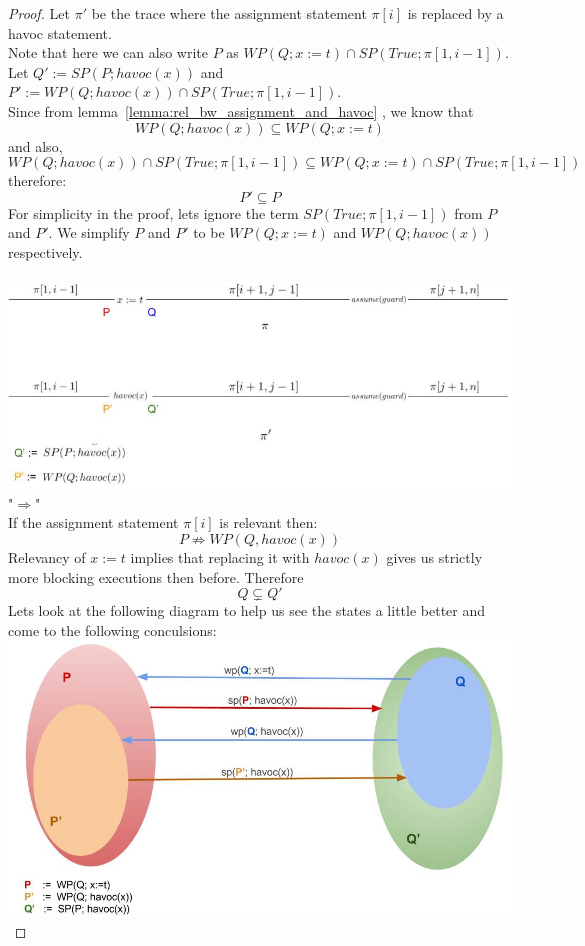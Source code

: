 \documentclass{article}
\newcommand{\limp}{\Rightarrow}
\begin{document}
\begin{proof}
Let $\pi'$ be the trace where the assignment statement $\pi[i]$ is replaced by a havoc statement. \\
Note that here we can also write $P$ as $WP(Q; x:=t) \cap SP(True; \pi[1, i-1])$.\\
Let $Q' := SP(P; havoc(x))$ and $P' := WP(Q;havoc(x)) \cap SP(True; \pi[1, i-1])$. \\
Since from lemma~\ref{lemma:rel_bw_assignment_and_havoc} , we know that 
$$WP(Q; havoc(x)) \subseteq WP(Q; x:=t)$$
and also,
$$WP(Q; havoc(x)) \cap SP(True; \pi[1, i-1])  \subseteq WP(Q; x:=t) \cap SP(True; \pi[1, i-1])$$
therefore:
$$P' \subseteq P$$
For simplicity in the proof, lets ignore the term $SP(True; \pi[1, i-1])$ from $P$ and $P'$. We simplify $P$ and $P'$ to be $WP(Q; x:=t)$ and $WP(Q; havoc(x))$ respectively. \\
\\
\includegraphics[width=\linewidth]{traces.jpg}\\
"$\Rightarrow$" \\
If the assignment statement $\pi[i]$ is relevant then:
$$P \not \limp WP(Q,havoc(x))$$
Relevancy of $x:=t$ implies that replacing it with $havoc(x)$ gives us strictly more blocking executions then before. Therefore
$$Q \subsetneq Q'$$
\newpage
Lets look at the following diagram to help us see the states a little better and come to the following conculsions:\\
\includegraphics[width=\linewidth]{states.jpg}\\

\end{proof}
\end{document}
